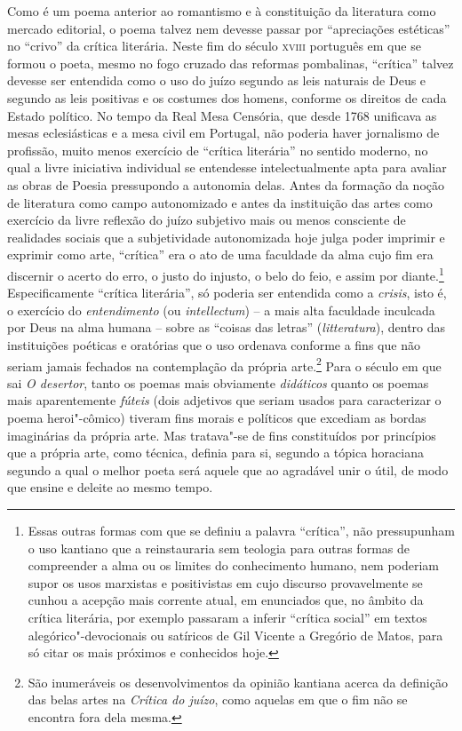 Como é um poema anterior ao romantismo e à constituição da literatura como
mercado editorial, o poema talvez nem devesse passar por ``apreciações
estéticas'' no ``crivo'' da crítica literária.  Neste fim do século
\textsc{xviii} português em que se formou o poeta, mesmo no fogo cruzado das
reformas pombalinas, ``crítica'' talvez devesse ser entendida como o uso do
juízo segundo as leis naturais de Deus e segundo as leis positivas e os costumes
dos homens, conforme os direitos de cada Estado político.  No tempo da Real Mesa
Censória, que desde 1768 unificava as mesas eclesiásticas e a mesa civil em
Portugal, não poderia haver jornalismo de profissão, muito menos exercício de
``crítica literária'' no sentido moderno, no qual a livre iniciativa individual
se entendesse intelectualmente apta para avaliar as obras de Poesia pressupondo
a autonomia delas.  Antes da formação da noção de literatura como campo
autonomizado e antes da instituição das artes como exercício da livre reflexão
do juízo subjetivo mais ou menos consciente de realidades sociais que a
subjetividade autonomizada hoje julga poder imprimir e exprimir como arte,
``crítica'' era o ato de uma faculdade da alma cujo fim era discernir o acerto
do erro, o justo do injusto, o belo do feio, e assim por diante.\footnote{ 
Essas outras formas com que se definiu a palavra ``crítica'', não pressupunham o
uso kantiano que a reinstauraria sem teologia para outras formas de compreender
a alma ou os limites do conhecimento humano, nem poderiam supor os usos
marxistas e positivistas em cujo discurso provavelmente se cunhou a acepção mais
corrente atual, em enunciados que, no âmbito da crítica literária, por exemplo
passaram a inferir ``crítica social'' em textos alegórico"-devocionais ou
satíricos de Gil Vicente a Gregório de Matos, para só citar os mais próximos e
conhecidos hoje.} Especificamente ``crítica literária'', só poderia ser
entendida como a \textit{crisis}, isto é, o exercício do \textit{entendimento}
(ou \textit{intellectum}) -- a mais alta faculdade inculcada por Deus na alma
humana -- sobre as ``coisas das letras'' (\textit{litteratura}), dentro das
instituições poéticas e oratórias que o uso ordenava conforme a fins que não
seriam jamais fechados na contemplação da própria arte.\footnote{ São
inumeráveis os desenvolvimentos da opinião kantiana acerca da definição das
belas artes na \textit{Crítica do juízo}, como aquelas em que o fim não se
encontra fora dela mesma.} Para o século em que sai \textit{O desertor}, tanto
os poemas mais obviamente \textit{didáticos} quanto os poemas mais aparentemente
\textit{fúteis} (dois adjetivos que seriam usados para caracterizar o poema
heroi"-cômico) tiveram fins morais e políticos que excediam as bordas imaginárias
da própria arte. Mas tratava"-se de fins constituídos por princípios que a
própria arte, como técnica, definia para si, segundo a tópica horaciana segundo
a qual o melhor poeta será aquele que ao agradável unir o útil, de modo que
ensine e deleite ao mesmo tempo.

